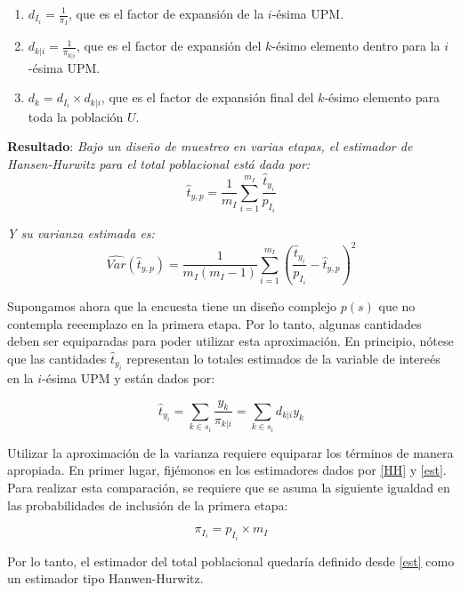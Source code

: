 \documentclass[12pt,spanish,]{book}
\providecommand{\tightlist}{%
  \setlength{\itemsep}{0pt}\setlength{\parskip}{0pt}}
\begin{document}
\begin{enumerate}
\def\labelenumi{\arabic{enumi}.}
\tightlist
\item
  \(d_{I_i} = \frac{1}{\pi_I}\), que es el factor de expansión de la \(i\)-ésima UPM.
\item
  \(d_{k|i} = \frac{1}{\pi_{k|i}}\), que es el factor de expansión del \(k\)-ésimo elemento dentro para la \(i\)-ésima UPM.
\item
  \(d_k = d_{I_i} \times d_{k|i}\), que es el factor de expansión final del \(k\)-ésimo elemento para toda la población \(U\).
\end{enumerate}

\textbf{Resultado}: \emph{Bajo un diseño de muestreo en varias etapas, el estimador de Hansen-Hurwitz para el total poblacional está dada por:}
\begin{equation}
\label{HH}
\hat{t}_{y,p}=\frac{1}{m_I}\sum_{i=1}^{m_I}\frac{\hat{t}_{y_i}}{p_{I_i}}
\end{equation}

\emph{Y su varianza estimada es:}
\begin{equation}
\label{var}
\widehat{Var}(\hat{t}_{y,p})=\frac{1}{m_I(m_I-1)}\sum_{i=1}^{m_I}\left(\frac{\hat{t}_{y_i}}{p_{I_i}}-\hat{t}_{y,p}\right)^2
\end{equation}

Supongamos ahora que la encuesta tiene un diseño complejo \(p(s)\) que no contempla reeemplazo en la primera etapa. Por lo tanto, algunas cantidades deben ser equiparadas para poder utilizar esta aproximación. En principio, nótese que las cantidades \(\hat{t}_{y_i}\) representan lo totales estimados de la variable de intereés en la \(i\)-ésima UPM y están dados por:

\begin{equation}
\hat{t}_{y_i} = \sum_{k \in s_i} \frac{y_k}{\pi_{k|i}}
= \sum_{k \in s_i} d_{k|i} y_k 
\end{equation}

Utilizar la aproximación de la varianza requiere equiparar los términos de manera apropiada. En primer lugar, fijémonos en los estimadores dados por \eqref{HH} y \eqref{est}. Para realizar esta comparación, se requiere que
se asuma la siguiente igualdad en las probabilidades de inclusión de la primera etapa:

\begin{equation}
\label{cons}
\pi_{I_i} = p_{I_i} \times m_I 
\end{equation}

Por lo tanto, el estimador del total poblacional quedaría definido desde \eqref{est} como un estimador tipo Hanwen-Hurwitz.
\end{document}
